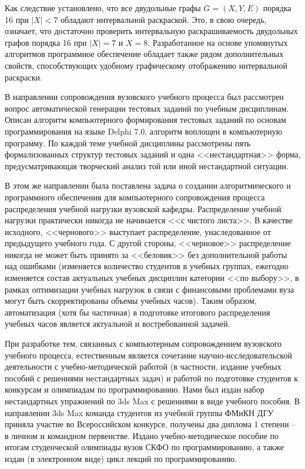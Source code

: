 Как следствие установлено, что все двудольные графы $G=(X,Y,E)$ порядка 16 при $|X|<7$ обладают интервальной раскраской. Это, в свою очередь, означает, что достаточно проверить интервальную раскрашиваемость двудольных графов порядка 16 при $|X|=7$ и $X=8$.
Разработанное на основе упомянутых алгоритмов программное обеспечение обладает также рядом дополнительных свойств, способствующих удобному графическому отображению интервальной раскраски.




В направлении сопровождения вузовского учебного процесса был рассмотрен вопрос автоматической генерации тестовых заданий по учебным дисциплинам.
Описан алгоритм компьютерного формирования тестовых заданий по
			основам программирования на языке Delphi 7.0, алгоритм воплощен в компьютерную программу. По каждой теме учебной дисциплины рассмотрены пять
			формализованных структур тестовых заданий и одна <<нестандартная>> форма, предусматривающая творческий анализ той или
			иной нестандартной ситуации.

В этом же направлении была поставлена задача о создании алгоритмического и программного обеспечения для компьютерного сопровождения процесса распределения учебной нагрузки вузовской кафедры.
Распределение учебной нагрузки практически никогда не начинается <<с
чистого листа>>. В качестве исходного, <<чернового>> выступает распределение, унаследованное от предыдущего учебного года.
С другой стороны, <<черновое>> распределение никогда не может быть принято за <<беловик>> без дополнительной работы над
ошибками (изменяется количество студентов в учебных группах, ежегодно изменяется состав актуальных учебных дисциплин
категории <<по выбору>>, в рамках оптимизации учебных нагрузок в связи с финансовыми проблемами вуза могут быть
скорректированы объемы учебных часов). Таким образом, автоматизация (хотя бы частичная) в подготовке итогового распределения учебных часов  является актуальной и востребованной задачей.


При разработке тем, связанных с компьютерным сопровождением вузовского учебного процесса, естественным является сочетание научно-исследовательской деятельности с учебно-методической работой (в частности, издание учебных пособий с решениями нестандартных задач) и работой по подготовке студентов к конкурсам и олимпиадам по программированию. Нами был издан набор нестандартных упражнений по 3ds Max с решениями в виде учебного пособия. В направлении 3ds Max команда студентов из учебной группы ФМиКН ДГУ приняла участие во Всероссийском конкурсе, получены два диплома 1 степени – в личном и командном первенстве. Издано учебно-методическое пособие по итогам студенческой олимпиады вузов СКФО по программированию, а также издан (в электронном виде) цикл лекций по программированию.


